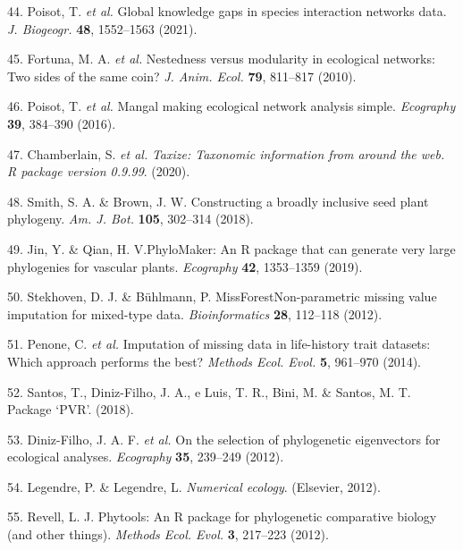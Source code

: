 \documentclass[
  12pt,
  a4paper,
]{article}
\begin{document}
\leavevmode\hypertarget{ref-poisot2021}{}%
44. Poisot, T. \emph{et al.} Global knowledge gaps in species interaction networks data. \emph{J. Biogeogr.} \textbf{48}, 1552--1563 (2021).

\leavevmode\hypertarget{ref-fortuna2010}{}%
45. Fortuna, M. A. \emph{et al.} Nestedness versus modularity in ecological networks: Two sides of the same coin? \emph{J. Anim. Ecol.} \textbf{79}, 811--817 (2010).

\leavevmode\hypertarget{ref-poisot2016}{}%
46. Poisot, T. \emph{et al.} Mangal making ecological network analysis simple. \emph{Ecography} \textbf{39}, 384--390 (2016).

\leavevmode\hypertarget{ref-chamberlain2020}{}%
47. Chamberlain, S. \emph{et al.} \emph{Taxize: Taxonomic information from around the web. R package version 0.9.99}. (2020).

\leavevmode\hypertarget{ref-smith2018}{}%
48. Smith, S. A. \& Brown, J. W. Constructing a broadly inclusive seed plant phylogeny. \emph{Am. J. Bot.} \textbf{105}, 302--314 (2018).

\leavevmode\hypertarget{ref-jin2019}{}%
49. Jin, Y. \& Qian, H. V.PhyloMaker: An R package that can generate very large phylogenies for vascular plants. \emph{Ecography} \textbf{42}, 1353--1359 (2019).

\leavevmode\hypertarget{ref-stekhoven2012}{}%
50. Stekhoven, D. J. \& Bühlmann, P. MissForestNon-parametric missing value imputation for mixed-type data. \emph{Bioinformatics} \textbf{28}, 112--118 (2012).

\leavevmode\hypertarget{ref-penone2014}{}%
51. Penone, C. \emph{et al.} Imputation of missing data in life-history trait datasets: Which approach performs the best? \emph{Methods Ecol. Evol.} \textbf{5}, 961--970 (2014).

\leavevmode\hypertarget{ref-santos2018}{}%
52. Santos, T., Diniz-Filho, J. A., e Luis, T. R., Bini, M. \& Santos, M. T. Package `PVR'. (2018).

\leavevmode\hypertarget{ref-diniz-filho2012}{}%
53. Diniz-Filho, J. A. F. \emph{et al.} On the selection of phylogenetic eigenvectors for ecological analyses. \emph{Ecography} \textbf{35}, 239--249 (2012).

\leavevmode\hypertarget{ref-legendre2012}{}%
54. Legendre, P. \& Legendre, L. \emph{Numerical ecology}. (Elsevier, 2012).

\leavevmode\hypertarget{ref-revell2012}{}%
55. Revell, L. J. Phytools: An R package for phylogenetic comparative biology (and other things). \emph{Methods Ecol. Evol.} \textbf{3}, 217--223 (2012).
\end{document}
